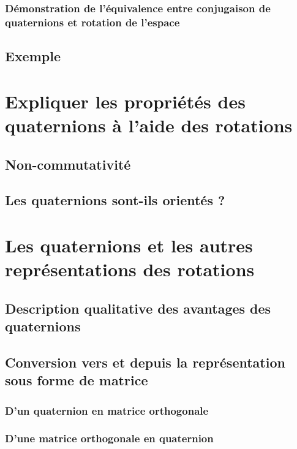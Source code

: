 		\subsubsection{Démonstration de l'équivalence entre conjugaison de quaternions et rotation de l'espace}
			
	\subsection{Exemple}
		
	
\section{Expliquer les propriétés des quaternions à l'aide des rotations}
	\subsection{Non-commutativité}
		
	\subsection{Les quaternions sont-ils orientés ?}
		
	
\section{Les quaternions et les autres représentations des rotations}
	\subsection{Description qualitative des avantages des quaternions}
		
	\subsection{Conversion vers et depuis la représentation sous forme de matrice}
		\subsubsection{D'un quaternion en matrice orthogonale}
			
		\subsubsection{D'une matrice orthogonale en quaternion}
			
